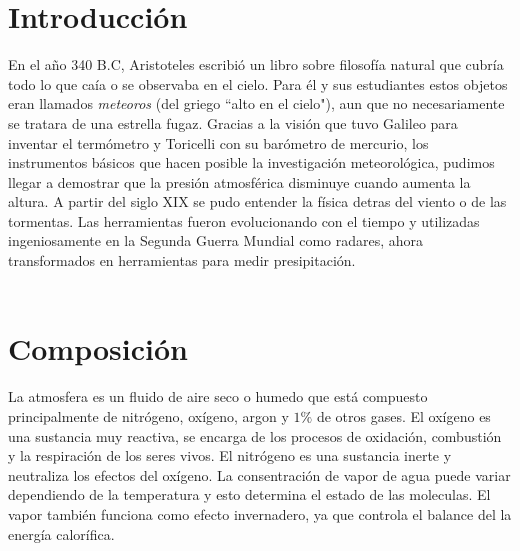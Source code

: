 \documentclass[12pt]{article}
\begin{document}
\newpage

\section{Introducci\'on}
\noindent 
En el año 340 B.C, Aristoteles escribi\'o un libro sobre filosof\'ia natural que cubr\'ia todo lo que ca\'ia o se observaba en el cielo. Para \'el y sus estudiantes estos objetos eran llamados \textit{meteoros} (del griego ``alto en el cielo"), aun que no necesariamente se tratara de una estrella fugaz. Gracias a la visi\'on que tuvo Galileo para inventar el term\'ometro y Toricelli con su bar\'ometro de mercurio, los instrumentos b\'asicos que hacen posible la investigaci\'on meteorol\'ogica, pudimos llegar a demostrar que la presi\'on atmosf\'erica disminuye cuando aumenta la altura. A partir del siglo XIX se pudo entender la f\'isica detras del viento o de las tormentas. Las herramientas fueron evolucionando con el tiempo y utilizadas ingeniosamente en la Segunda Guerra Mundial como radares, ahora transformados en herramientas para medir presipitaci\'on. \\ \\




\section{Composici\'on}
\noindent 
La atmosfera es un fluido de aire seco o humedo que est\'a compuesto principalmente de nitr\'ogeno, ox\'igeno, argon y $1\%$ de otros gases. El ox\'igeno es una sustancia muy reactiva, se encarga de los procesos de oxidaci\'on, combusti\'on y la respiraci\'on de los seres vivos. El nitr\'ogeno es una sustancia inerte y neutraliza los efectos del ox\'igeno. La consentraci\'on de vapor de agua puede variar dependiendo de la temperatura y esto determina el estado de las moleculas. El vapor tambi\'en funciona como efecto invernadero, ya que controla el balance del la energ\'ia calor\'ifica.
\end{document}
